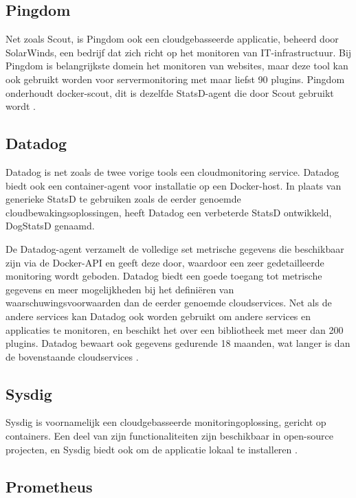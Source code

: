 \subsection{Pingdom}

Net zoals Scout, is Pingdom ook een cloudgebasseerde applicatie, beheerd door SolarWinds, een bedrijf dat zich richt op het monitoren van IT-infrastructuur. Bij Pingdom is belangrijkste domein het monitoren van websites, maar deze tool kan ook gebruikt worden voor servermonitoring met maar liefst 90 plugins. Pingdom onderhoudt docker-scout, dit is dezelfde StatsD-agent die door Scout gebruikt wordt \autocite{Sissons2021}.

\subsection{Datadog}

Datadog is net zoals de twee vorige tools een cloudmonitoring service.  Datadog biedt ook een container-agent voor installatie op een Docker-host. In plaats van generieke StatsD te gebruiken zoals de eerder genoemde cloudbewakingsoplossingen, heeft Datadog een verbeterde StatsD ontwikkeld, DogStatsD genaamd.

De Datadog-agent verzamelt de volledige set metrische gegevens die beschikbaar zijn via de Docker-API en geeft deze door, waardoor een zeer gedetailleerde monitoring wordt geboden. Datadog biedt een goede toegang tot metrische gegevens en meer mogelijkheden bij het definiëren van waarschuwingsvoorwaarden dan de eerder genoemde cloudservices. Net als de andere services kan Datadog ook worden gebruikt om andere services en applicaties te monitoren, en beschikt het over een bibliotheek met meer dan 200 plugins. Datadog bewaart ook gegevens gedurende 18 maanden, wat langer is dan de bovenstaande cloudservices \autocite{Sissons2021}.

\subsection{Sysdig}

Sysdig is voornamelijk een cloudgebasseerde monitoringoplossing, gericht op containers. Een deel van zijn functionaliteiten zijn beschikbaar in open-source projecten, en Sysdig biedt ook om de applicatie lokaal te installeren \autocite{Sissons2021}.

\subsection{Prometheus}


